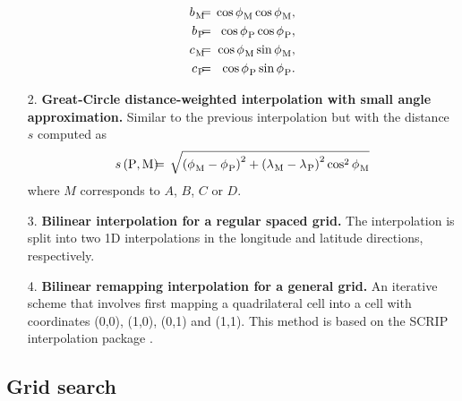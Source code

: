\documentclass[NEMO_book]{subfiles}
\begin{document}
\begin{enumerate}
\begin{eqnarray}
      {b_{}}_{\rm M} & \hspace{-2mm} = \hspace{-2mm} & \cos {\phi_{}}_{\rm M} \cos {\phi_{}}_{\rm M}, 
      \nonumber \\
      {b_{}}_{\rm P} & \hspace{-2mm} = \hspace{-2mm} & \cos {\phi_{}}_{\rm P} \cos {\phi_{}}_{\rm P}, 
      \nonumber \\
      {c_{}}_{\rm M} & \hspace{-2mm} = \hspace{-2mm} & \cos {\phi_{}}_{\rm M} \sin {\phi_{}}_{\rm M}, 
      \nonumber \\
      {c_{}}_{\rm P} & \hspace{-2mm} = \hspace{-2mm} & \cos {\phi_{}}_{\rm P} \sin {\phi_{}}_{\rm P}.
      \nonumber
   \nonumber
  \end{eqnarray}

\item[2.] {\bf Great-Circle distance-weighted interpolation with small angle
  approximation.} Similar to the previous interpolation but with the
  distance $s$ computed as
  \begin{eqnarray}
    s\left( {\rm P}, {\rm M} \right) 
     & \hspace{-2mm} = \hspace{-2mm} & 
      \sqrt{ \left( {\phi_{}}_{\rm M} - {\phi_{}}_{\rm P} \right)^{2} 
      + \left( {\lambda_{}}_{\rm M} - {\lambda_{}}_{\rm P} \right)^{2}
        \cos^{2} {\phi_{}}_{\rm M} }
  \end{eqnarray}
  where $M$ corresponds to $A$, $B$, $C$ or $D$.

\item[3.] {\bf Bilinear interpolation for a regular spaced grid.} The
  interpolation is split into two 1D interpolations in the longitude
  and latitude directions, respectively.

\item[4.] {\bf Bilinear remapping interpolation for a general grid.} An
  iterative scheme that involves first mapping a quadrilateral cell
  into a cell with coordinates (0,0), (1,0), (0,1) and (1,1). This
  method is based on the SCRIP interpolation package \citep{Jones_1998}.
  
\end{enumerate}

\subsection{Grid search}
\end{document}
